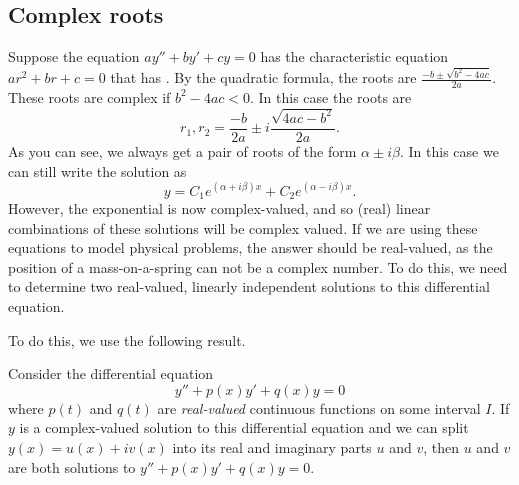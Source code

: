 \subsection{Complex roots}

Suppose the equation $ay'' + by' + cy = 0$ has the 
characteristic equation
$a r^2 + b r + c = 0$ that has .
By the quadratic
formula, the roots are
$\frac{-b \pm \sqrt{b^2 - 4ac}}{2a}$.
These roots are complex if $b^2 - 4ac < 0$.  In this case the
roots are
\begin{equation*}
r_1, r_2 = \frac{-b}{2a} \pm i\frac{\sqrt{4ac - b^2}}{2a} .
\end{equation*}
As you can see, we always get a pair of roots of the form $\alpha \pm i
\beta$.  In this case we can still write the solution as
\begin{equation*}
y = C_1 e^{(\alpha+i\beta)x} + C_2 e^{(\alpha-i\beta)x} .
\end{equation*}
However, the exponential is now complex-valued, and so (real) linear combinations of these solutions will be complex valued. If we are using these equations to model physical problems, the answer should be real-valued, as the position of a mass-on-a-spring can not be a complex number. To do this, we need to determine two real-valued, linearly independent solutions to this differential equation.

To do this, we use the following result.

\begin{theorem1}{}
Consider the differential equation 
\begin{equation*}
y'' + p(x)y' + q(x)y = 0
\end{equation*}
where $p(t)$ and $q(t)$ are \emph{real-valued} continuous functions on some interval $I$. If $y$ is a complex-valued solution to this differential equation and we can split $y(x) = u(x) + i v(x)$ into its real and imaginary parts $u$ and $v$, then $u$ and $v$ are both solutions to $y'' + p(x)y' + q(x)y = 0$.
\end{theorem1} 

